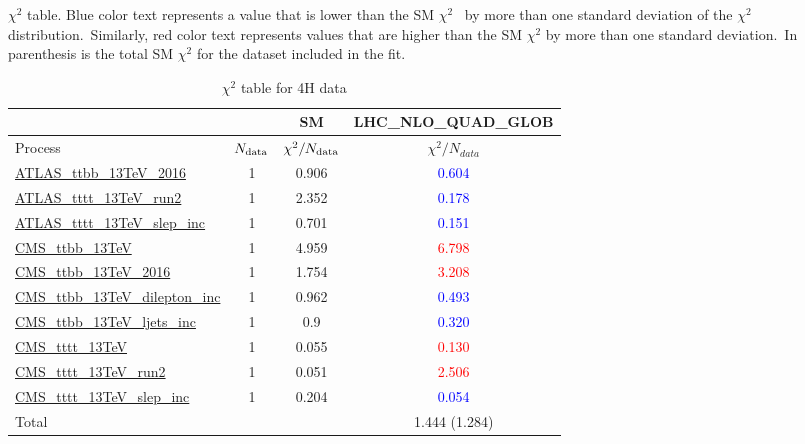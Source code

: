 \documentclass{article}
\begin{document}
$\chi^2$ table. Blue color text represents a value that is lower than the SM $\chi^2$ \
            by more than one standard deviation of the $\chi^2$ distribution.\
            Similarly, red color text represents values that are higher than the SM $\chi^2$ by more than one standard deviation.\
            In parenthesis is the total SM $\chi^2$ for the dataset included in the fit. \\
\begin{table}[H]
\centering
\begin{tabular}{|l|c|c|c|}
\hline
 \multicolumn{2}{|c|}{} & SM& LHC_NLO_QUAD_GLOB\\ \hline
Process & $N_{\rm data}$ & $\chi^ 2/N_{\rm data}$& $\chi^ 2/N_{data}$\\ \hline
\href{https://arxiv.org}{ATLAS_ttbb_13TeV_2016} & 1 & 0.906 & \textcolor{blue}                            {0.604} \\ \hline
\href{https://arxiv.org}{ATLAS_tttt_13TeV_run2} & 1 & 2.352 & \textcolor{blue}                            {0.178} \\ \hline
\href{https://arxiv.org}{ATLAS_tttt_13TeV_slep_inc} & 1 & 0.701 & \textcolor{blue}                            {0.151} \\ \hline
\href{https://arxiv.org}{CMS_ttbb_13TeV} & 1 & 4.959 & \textcolor{red}                            {6.798} \\ \hline
\href{https://arxiv.org}{CMS_ttbb_13TeV_2016} & 1 & 1.754 & \textcolor{red}                            {3.208} \\ \hline
\href{https://arxiv.org}{CMS_ttbb_13TeV_dilepton_inc} & 1 & 0.962 & \textcolor{blue}                            {0.493} \\ \hline
\href{https://arxiv.org}{CMS_ttbb_13TeV_ljets_inc} & 1 & 0.9 & \textcolor{blue}                            {0.320} \\ \hline
\href{https://arxiv.org}{CMS_tttt_13TeV} & 1 & 0.055 & \textcolor{red}                            {0.130} \\ \hline
\href{https://arxiv.org}{CMS_tttt_13TeV_run2} & 1 & 0.051 & \textcolor{red}                            {2.506} \\ \hline
\href{https://arxiv.org}{CMS_tttt_13TeV_slep_inc} & 1 & 0.204 & \textcolor{blue}                            {0.054} \\ \hline
\hline Total & &  & 1.444 (1.284) \\ \hline
\end{tabular}
\caption{$\chi^2$ table for 4H data}
\end{table}
\end{document}
